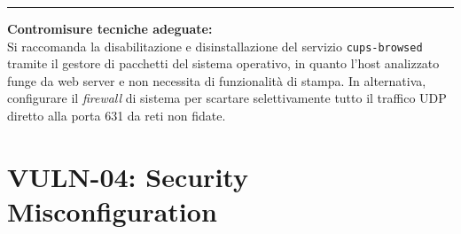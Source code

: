 \documentclass[11pt]{report}
\begin{document}
\begin{tcolorbox}[colback=gray!5, colframe=headerblue, arc=3pt, boxrule=0.8pt, breakable]
		\vspace{0.2cm}\hrule\vspace{0.2cm}
		
		\textbf{Contromisure tecniche adeguate:}\\
		Si raccomanda la disabilitazione e disinstallazione del servizio \texttt{cups-browsed} tramite il gestore di pacchetti del sistema operativo, in quanto l'host analizzato funge da web server e non necessita di funzionalità di stampa. In alternativa, configurare il \textit{firewall} di sistema per scartare selettivamente tutto il traffico UDP diretto alla porta 631 da reti non fidate.
	\end{tcolorbox}
	
	\section{VULN-04: Security Misconfiguration}
\end{document}
